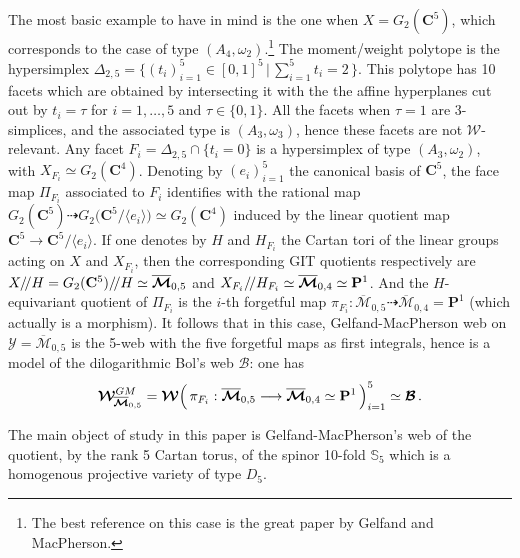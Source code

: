 \documentclass[11pt]{amsart}
\begin{document}
The most basic example to have in mind is the one when $X=G_2(\mathbf C^5)$, which corresponds to the case of type $(A_4,\omega_2)$.\footnote{The best reference on this case is the great paper \cite{GM} by Gelfand and MacPherson.} The moment/weight polytope is the hypersimplex $\Delta_{2,5}=\{ (t_i)_{i=1}^5\in [0,1]^5\, \lvert \, \sum_{i=1}^5 t_i=2\,\}$. This polytope has 10 facets which are obtained by intersecting it with the 
 the affine hyperplanes cut out by $t_i=\tau$ for $i=1,\ldots,5$ and $\tau\in \{0,1\}$. All the facets when $\tau=1$ are 3-simplices, and the associated type is $(A_3,\omega_3)$, hence these facets are not ${\mathcal W}$-relevant. Any facet $F_i=\Delta_{2,5} \cap \{ t_i=0\}$ is a hypersimplex of type  $(A_3,\omega_2)$, with $X_{F_i}\simeq G_2(\mathbf C^4)$. 
Denoting by $(e_i)_{i=1}^5 $ the canonical basis of $\mathbf C^5$, 
 the face map $\Pi_{F_i}$ associated to $F_i$ identifies with the rational map
 $G_2(\mathbf C^5)\dashrightarrow G_2\big(\mathbf C^5/{\langle e_i\rangle}\big)
 \simeq G_2(\mathbf C^4) $ induced by the 
 linear quotient map $\mathbf C^5 
 \rightarrow 
 \mathbf C^5/{\langle e_i\rangle}$. 
 If one denotes by $H$ and $H_{F_i}$ the Cartan tori of the linear groups acting on 
 $X$ and $X_{F_i}$, then the corresponding GIT quotients respectively are 
 $X/\hspace{-0.06cm} / H= G_2(\mathbf C^5)/\hspace{-0.06cm} / H\simeq \overline{\boldsymbol{\mathcal M}}_{0,5}$ and $X_{F_i}/\hspace{-0.05cm} / H_{F_i} \simeq 
 \overline{\boldsymbol{\mathcal M}}_{0,4}\simeq 
 \mathbf P^1$. And the $H$-equivariant quotient of $\Pi_{F_i}$ is the $i$-th forgetful map  
 $
\pi_{F_i} :  \overline{\boldsymbol{\mathcal M}}_{0,5}\dashrightarrow \overline{\boldsymbol{\mathcal M}}_{0,4} = \mathbf P^1$ (which actually is a morphism). 
 It follows that in this case, Gelfand-MacPherson web on $\boldsymbol{\mathcal Y}=
 \overline{\boldsymbol{\mathcal M}}_{0,5}$ is the 5-web with the five forgetful maps as first integrals, hence is a model of the dilogarithmic Bol's web $\boldsymbol{\mathcal B}$: one has 
 $$\boldsymbol{\mathcal{W}}^{GM}_{\hspace{-0.05cm}\overline{\boldsymbol{\mathcal M}}_{0,5}}
 =\boldsymbol{\mathcal{W}}\Big( \, \pi_{F_i}: 
 \overline{\boldsymbol{\mathcal M}}_{0,5}\longrightarrow \overline{\boldsymbol{\mathcal M}}_{0,4} \simeq \mathbf P^1
 \,\Big)_{i=1}^5 \simeq \boldsymbol{\mathcal B}\, . $$ 


The main object of study in this paper is Gelfand-MacPherson's web of the quotient, by the rank 5 Cartan torus, of the spinor 10-fold $\mathbb S_5$ which is a homogenous projective variety of type $D_5$. 
\end{document}
